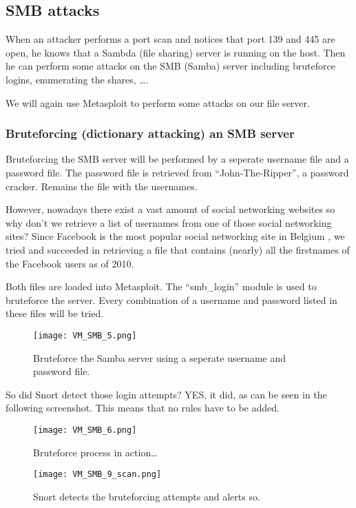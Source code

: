 \clearpage

\subsection{SMB attacks}

When an attacker performs a port scan and notices that port 139 and 445 are open, he knows that a Sambda (file sharing) server is running on the host. Then he can perform some attacks on the SMB (Samba) server including bruteforce logins, enumerating the shares, \ldots.

We will again use Metasploit to perform some attacks on our file server.

\subsubsection{Bruteforcing (dictionary attacking) an SMB server}

Bruteforcing the SMB server will be performed by a seperate username file and a password file. The password file is retrieved from ``John-The-Ripper'', a password cracker. Remains the file with the usernames. 

However, nowadays there exist a vast amount of social networking websites so why don't we retrieve a list of usernames from one of those social networking sites? Since Facebook is the most popular social networking site in Belgium \citep{Facebook}, we tried and succeeded in retrieving a file that contains (nearly) all the firstnames of the Facebook users as of 2010.

Both files are loaded into Metasploit. The ``smb\_login'' module is used to bruteforce the server. Every combination of a username and password listed in these files will be tried. 
\begin{figure}[h]
    \centering
    \texttt{[image: VM\_SMB\_5.png]}
    \caption{Bruteforce the Samba server using a seperate username and password file.}
\end{figure}

\clearpage
So did Snort detect those login attempts? YES, it did, as can be seen in the following screenshot. This means that no rules have to be added.
\begin{figure}[h]
    \centering
    \texttt{[image: VM\_SMB\_6.png]}
    \caption{Bruteforce process in action\ldots}
\end{figure}

\begin{figure}[h]
    \centering
    \texttt{[image: VM\_SMB\_9\_scan.png]}
    \caption{Snort detects the bruteforcing attempts and alerts so.}
\end{figure}

